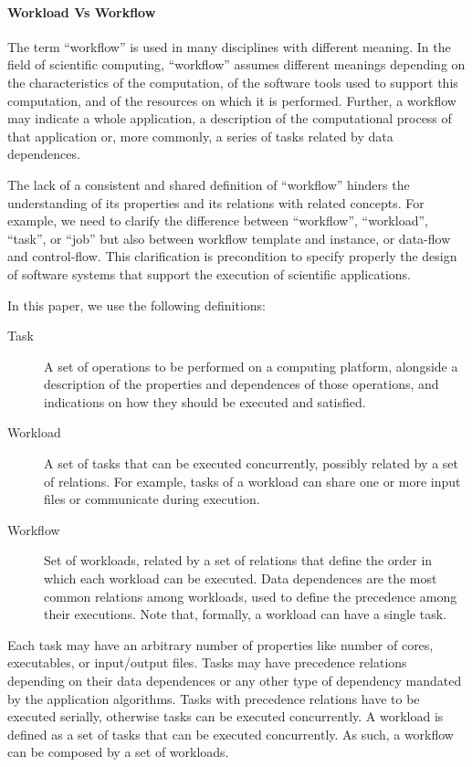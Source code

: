 \documentclass[10pt, conference, compsocconf]{IEEEtran}
\begin{document}
\paragraph*{Workload Vs Workflow} The term ``workflow'' is used in many
disciplines with different meaning. In the field of scientific computing,
``workflow'' assumes different meanings depending on the characteristics of
the computation, of the software tools used to support this computation, and
of the resources on which it is performed. Further, a workflow may indicate a
whole application, a description of the computational process of that
application or, more commonly, a series of tasks related by data
dependences.

The lack of a consistent and shared definition of ``workflow'' hinders the
understanding of its properties and its relations with related concepts. For
example, we need to clarify the difference between ``workflow'', ``workload'',
``task'', or ``job'' but also between workflow template and instance, or
data-flow and control-flow. This clarification is precondition to specify
properly the design of software systems that support the execution of
scientific applications.

In this paper, we use the following definitions:

\begin{description}
  \item[Task]     A set of operations to be performed on a computing platform,
                  alongside a description of the properties and dependences of
                  those operations, and indications on how they should be
                  executed and satisfied.
  \item[Workload] A set of tasks that can be executed concurrently, possibly
                  related by a set of relations. For example, tasks of a workload can share one or more input files or communicate during execution.
  \item[Workflow] Set of workloads, related by a set of relations that define
                  the order in which each workload can be executed. Data
                  dependences are the most common relations among workloads,
                  used to define the precedence among their executions. Note
                  that, formally, a workload can have a single task.
\end{description}

Each task may have an arbitrary number of properties like number of cores,
executables, or input/output files. Tasks may have precedence relations
depending on their data dependences or any other type of dependency mandated
by the application algorithms. Tasks with precedence relations have to be
executed serially, otherwise tasks can be executed concurrently. A workload is
defined as a set of tasks that can be executed concurrently. As such, a
workflow can be composed by a set of workloads.
\end{document}
